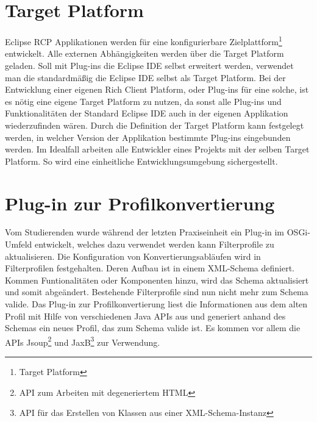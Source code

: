 \section{Target Platform}{
Eclipse \ac{RCP} Applikationen werden für eine konfigurierbare Zielplattform\footnote{Target Platform} entwickelt. Alle externen Abhängigkeiten werden über die Target Platform geladen. Soll mit Plug-ins die Eclipse \ac{IDE} selbst erweitert werden, verwendet man die standardmäßig die Eclipse \ac{IDE} selbst als Target Platform. \cite[vgl.S14]{RalfEbert} Bei der Entwicklung einer eigenen Rich Client Platform, oder Plug-ins für eine solche, ist es nötig eine eigene Target Platform zu nutzen, da sonst alle Plug-ins und Funktionalitäten der Standard Eclipse IDE auch in der eigenen Applikation wiederzufinden wären. Durch die Definition der Target Platform kann festgelegt werden, in welcher Version der Applikation bestimmte Plug-ins eingebunden werden. Im Idealfall arbeiten alle Entwickler eines Projekts mit der selben Target Platform. So wird eine einheitliche Entwicklungsumgebung sichergestellt.
}

\section{Plug-in zur Profilkonvertierung}{
Vom Studierenden wurde während der letzten Praxiseinheit ein Plug-in im \ac{OSGi}-Umfeld entwickelt, welches dazu verwendet werden kann Filterprofile zu aktualisieren. Die Konfiguration von Konvertierungsabläufen wird in Filterprofilen festgehalten. Deren Aufbau ist in einem XML-Schema definiert. Kommen Funtionalitäten oder Komponenten hinzu, wird das Schema aktualisiert und somit abgeändert. Bestehende Filterprofile sind nun nicht mehr zum Schema valide. Das Plug-in zur Profilkonvertierung liest die Informationen aus dem alten Profil mit Hilfe von verschiedenen Java \ac{API}s aus und generiert anhand des Schemas ein neues Profil, das zum Schema valide ist. Es kommen vor allem die \ac{API}s  Jsoup\footnote{API zum Arbeiten mit degeneriertem HTML} und JaxB\footnote{API für das Erstellen von Klassen aus einer XML-Schema-Instanz} zur Verwendung.
}

